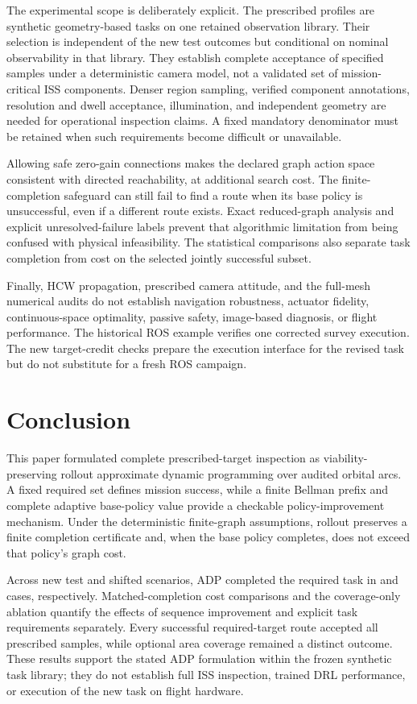 The experimental scope is deliberately explicit. The prescribed profiles are synthetic geometry-based tasks on one retained observation library. Their selection is independent of the new test outcomes but conditional on nominal observability in that library. They establish complete acceptance of specified samples under a deterministic camera model, not a validated set of mission-critical ISS components. Denser region sampling, verified component annotations, resolution and dwell acceptance, illumination, and independent geometry are needed for operational inspection claims. A fixed mandatory denominator must be retained when such requirements become difficult or unavailable.

Allowing safe zero-gain connections makes the declared graph action space consistent with directed reachability, at additional search cost. The finite-completion safeguard can still fail to find a route when its base policy is unsuccessful, even if a different route exists. Exact reduced-graph analysis and explicit unresolved-failure labels prevent that algorithmic limitation from being confused with physical infeasibility. The statistical comparisons also separate task completion from cost on the selected jointly successful subset.

Finally, HCW propagation, prescribed camera attitude, and the full-mesh numerical audits do not establish navigation robustness, actuator fidelity, continuous-space optimality, passive safety, image-based diagnosis, or flight performance. The historical ROS example verifies one corrected survey execution. The new target-credit checks prepare the execution interface for the revised task but do not substitute for a fresh ROS campaign.

\section{Conclusion}
\label{sec:conclusion}

This paper formulated complete prescribed-target inspection as viability-preserving rollout approximate dynamic programming over audited orbital arcs. A fixed required set defines mission success, while a finite Bellman prefix and complete adaptive base-policy value provide a checkable policy-improvement mechanism. Under the deterministic finite-graph assumptions, rollout preserves a finite completion certificate and, when the base policy completes, does not exceed that policy's graph cost.

Across \RTTestN{} new test and \RTOodN{} shifted scenarios, ADP completed the required task in \RTTestSuccess{} and \RTOodSuccess{} cases, respectively. Matched-completion cost comparisons and the coverage-only ablation quantify the effects of sequence improvement and explicit task requirements separately. Every successful required-target route accepted all prescribed samples, while optional area coverage remained a distinct outcome. These results support the stated ADP formulation within the frozen synthetic task library; they do not establish full ISS inspection, trained DRL performance, or execution of the new task on flight hardware.

